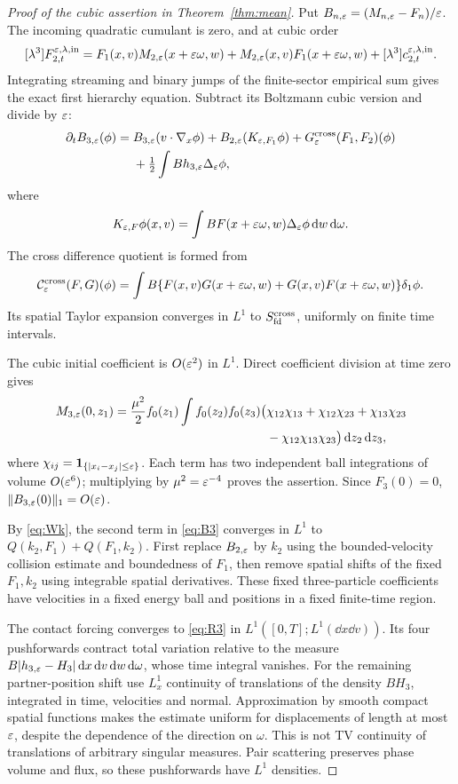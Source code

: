 \documentclass[11pt,letterpaper]{article}
\theoremstyle{remark}\newtheorem{remark}[theorem]{Remark}
\numberwithin{equation}{section}
\newcommand{\Sfd}{S_{\mathrm{fd}}}\newcommand{\U}{\mathcal U}\newcommand{\D}{\mathcal D}
\begin{document}
\begin{proof}[Proof of the cubic assertion in Theorem~\ref{thm:mean}]
Put $B_{n,\varepsilon}=(M_{n,\varepsilon}-F_n)/\varepsilon$. The incoming quadratic cumulant is zero, and at cubic order
\[
 [\lambda^3]F_{2,t}^{\varepsilon,\lambda,\rm in}
 =F_1(x,v)M_{2,\varepsilon}(x+\varepsilon\omega,w)
  +M_{2,\varepsilon}(x,v)F_1(x+\varepsilon\omega,w)
  +[\lambda^3]c_{2,t}^{\varepsilon,\lambda,\rm in}.
\]
Integrating streaming and binary jumps of the finite-sector empirical sum gives the exact first hierarchy equation. Subtract its Boltzmann cubic version and divide by $\varepsilon$:
\begin{equation}\label{eq:B3}
 \begin{split}
 \partial_t B_{3,\varepsilon}(\phi)={}&B_{3,\varepsilon}(v\cdot\nabla_x\phi)
   +B_{2,\varepsilon}(K_{\varepsilon,F_1}\phi)
   +G_\varepsilon^{\rm cross}(F_1,F_2)(\phi)\\
 &+\tfrac12\int Bh_{3,\varepsilon}\Delta_\varepsilon\phi,
 \end{split}
\end{equation}
where
\[
 K_{\varepsilon,F}\phi(x,v)=\int BF(x+\varepsilon\omega,w)\Delta_\varepsilon\phi\,\mathrm d w\,\mathrm d\omega.
\]
The cross difference quotient is formed from
\[
 \mathcal C_\varepsilon^{\rm cross}(F,G)(\phi)
 =\int B\{F(x,v)G(x+\varepsilon\omega,w)+G(x,v)F(x+\varepsilon\omega,w)\}\delta_1\phi.
\]
Its spatial Taylor expansion converges in $L^1$ to $\Sfd^{\rm cross}$, uniformly on finite time intervals.

The cubic initial coefficient is $O(\varepsilon^2)$ in $L^1$. Direct coefficient division at time zero gives
\[
 \begin{split}
 M_{3,\varepsilon}(0,z_1)=\frac{\mu^2}{2}f_0(z_1)\int f_0(z_2)f_0(z_3)
 \bigl(&\chi_{12}\chi_{13}+\chi_{12}\chi_{23}+\chi_{13}\chi_{23}\\
       &-\chi_{12}\chi_{13}\chi_{23}\bigr)\,\mathrm d z_2\,\mathrm d z_3,
 \end{split}
\]
where $\chi_{ij}=\mathbf1_{\{|x_i-x_j|\le\varepsilon\}}$. Each term has two independent ball integrations of volume $O(\varepsilon^6)$; multiplying by $\mu^2=\varepsilon^{-4}$ proves the assertion. Since $F_3(0)=0$, $\|B_{3,\varepsilon}(0)\|_1=O(\varepsilon)$.

By \eqref{eq:Wk}, the second term in \eqref{eq:B3} converges in $L^1$ to $Q(k_2,F_1)+Q(F_1,k_2)$. First replace $B_{2,\varepsilon}$ by $k_2$ using the bounded-velocity collision estimate and boundedness of $F_1$, then remove spatial shifts of the fixed $F_1,k_2$ using integrable spatial derivatives. These fixed three-particle coefficients have velocities in a fixed energy ball and positions in a fixed finite-time region.

The contact forcing converges to \eqref{eq:R3} in $L^1([0,T];L^1(\dd x\dd v))$. Its four pushforwards contract total variation relative to the measure $B|h_{3,\varepsilon}-H_3|\,\mathrm d x\,\mathrm d v\,\mathrm d w\,\mathrm d\omega$, whose time integral vanishes. For the remaining partner-position shift use $L^1_x$ continuity of translations of the density $BH_3$, integrated in time, velocities and normal. Approximation by smooth compact spatial functions makes the estimate uniform for displacements of length at most $\varepsilon$, despite the dependence of the direction on $\omega$. This is not TV continuity of translations of arbitrary singular measures. Pair scattering preserves phase volume and flux, so these pushforwards have $L^1$ densities.


\end{proof}
\end{document}
